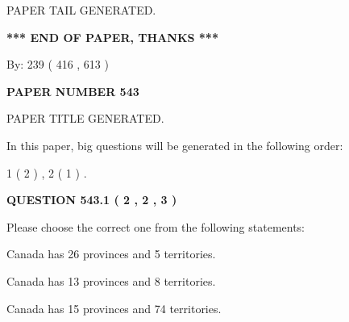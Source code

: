 \documentclass[12pt]{article}
\begin{document}
   
   
   
   
   
 \vspace{0.2in}
 
   
   
\vspace{2.0in} PAPER TAIL GENERATED.
   
   
   
   
\vspace{1.0in} 
{\textbf{\large{ *** END OF PAPER, THANKS *** }}} 
   
   
\hspace{1.0in} By: 
 239 ( 416 ,  613 )
   
   
   
   
\newpage 
\setcounter{page}{ 
   543001 } 
   
   
   
   
 {\textbf{ \Large{ PAPER NUMBER  543  }}}
   
   
\vspace{0.2in}
   
   
   
   
   
   
   
   
 \vspace{0.2in}
 
 
 
 
   
   
 PAPER TITLE GENERATED.
   
   
   
\vspace{0.2in}
   
In this paper, big questions will be generated in the following order: 
   
   
   1 ( 2 )
 ,
   2 ( 1 )
 .
  
\vspace{0.2in}
  
{\textbf{\Large{QUESTION
543.1 
 ( 2 , 2 , 3 )
}}}
  
  
Please choose the correct one from the following statements:
 
 
Canada has  26 provinces and  5 territories.
 
 
Canada has  13 provinces and  8 territories.
 
 
Canada has  15 provinces and  74 territories.
 
\end{document}
